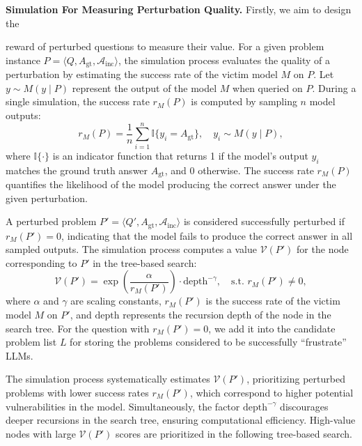 \textbf{Simulation For Measuring Perturbation Quality.} Firstly, we aim to design the {reward of perturbed questions to measure their value. For a given problem instance \( P = \langle Q, A_\text{gt}, \mathcal{A}_\text{inc} \rangle \), the simulation process evaluates the quality of a perturbation by estimating the success rate of the victim model \( M \) on \( P \). Let \( y \sim M(y \mid P) \) represent the output of the model \( M \) when queried on \( P \). During a single simulation, the success rate \( r_M(P) \) is computed by sampling \( n \) model outputs:
\begin{equation}
r_M(P) = \frac{1}{n} \sum_{i=1}^{n} \mathbb{I}\{y_i = A_\text{gt}\}, \quad y_i \sim M(y \mid P),
\end{equation}
where \( \mathbb{I}\{\cdot\} \) is an indicator function that returns 1 if the model’s output \( y_i \) matches the ground truth answer \( A_\text{gt} \), and 0 otherwise. The success rate \( r_M(P) \) quantifies the likelihood of the model producing the correct answer under the given perturbation.

A perturbed problem \( P' = \langle Q', A_\text{gt}, \mathcal{A}_\text{inc} \rangle \) is considered successfully perturbed if \( r_M(P') = 0\), indicating that the model fails to produce the correct answer in all sampled outputs. The simulation process computes a value \( \mathcal{V}(P') \) for the node corresponding to \( P' \) in the tree-based search:
\begin{equation}
\mathcal{V}(P') = \exp\left(\frac{\alpha}{r_M(P')}\right) \cdot \text{depth}^{-\gamma}, \quad \text{s.t. } r_M(P') \neq 0,
\end{equation}
where \( \alpha \) and \( \gamma \) are scaling constants, \( r_M(P') \) is the success rate of the victim model \( M \) on \( P' \), and \( \text{depth} \) represents the recursion depth of the node in the search tree. For the question with \( r_M(P')=0 \), we add it into the candidate problem list $L$ for storing the problems considered to be successfully ``frustrate'' LLMs. 

The simulation process systematically estimates \( \mathcal{V}(P') \), prioritizing perturbed problems with lower success rates \( r_M(P') \), which correspond to higher potential vulnerabilities in the model. Simultaneously, the factor \( \text{depth}^{-\gamma} \) discourages deeper recursions in the search tree, ensuring computational efficiency. High-value nodes with large \( \mathcal{V}(P') \) scores are prioritized in the following tree-based search. 


}
